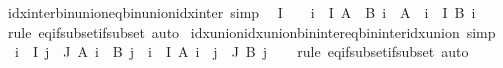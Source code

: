 \begin{isabellebody}
\endisatagproof
{\isafoldproof}%
%
\isadelimproof
\isanewline
%
\endisadelimproof
\isanewline
{}\isamarkupfalse%
\ idx{\isacharunderscore}{\kern0pt}inter{\isacharunderscore}{\kern0pt}bin{\isacharunderscore}{\kern0pt}union{\isacharunderscore}{\kern0pt}eq{\isacharunderscore}{\kern0pt}bin{\isacharunderscore}{\kern0pt}union{\isacharunderscore}{\kern0pt}idx{\isacharunderscore}{\kern0pt}inter\ {\isacharbrackleft}{\kern0pt}simp{\isacharbrackright}{\kern0pt}{\isacharcolon}{\kern0pt}\isanewline
\ \ {\isachardoublequoteopen}I\ {\isasymnoteq}\ {\isacharbraceleft}{\kern0pt}{\isacharbraceright}{\kern0pt}\ {\isasymLongrightarrow}\ {\isacharparenleft}{\kern0pt}{\isasymInter}i\ {\isasymin}\ I{\isachardot}{\kern0pt}\ A\ {\isasymunion}\ B\ i{\isacharparenright}{\kern0pt}\ {\isacharequal}{\kern0pt}\ A\ {\isasymunion}\ {\isacharparenleft}{\kern0pt}{\isasymInter}i\ {\isasymin}\ I{\isachardot}{\kern0pt}\ B\ i{\isacharparenright}{\kern0pt}{\isachardoublequoteclose}\isanewline
%
\isadelimproof
\ \ %
\endisadelimproof
%
\isatagproof
{}\isamarkupfalse%
\ {\isacharparenleft}{\kern0pt}rule\ eq{\isacharunderscore}{\kern0pt}if{\isacharunderscore}{\kern0pt}subset{\isacharunderscore}{\kern0pt}if{\isacharunderscore}{\kern0pt}subset{\isacharparenright}{\kern0pt}\ auto%
\endisatagproof
{\isafoldproof}%
%
\isadelimproof
\isanewline
%
\endisadelimproof
\isanewline
{}\isamarkupfalse%
\ idx{\isacharunderscore}{\kern0pt}union{\isacharunderscore}{\kern0pt}idx{\isacharunderscore}{\kern0pt}union{\isacharunderscore}{\kern0pt}bin{\isacharunderscore}{\kern0pt}inter{\isacharunderscore}{\kern0pt}eq{\isacharunderscore}{\kern0pt}bin{\isacharunderscore}{\kern0pt}inter{\isacharunderscore}{\kern0pt}idx{\isacharunderscore}{\kern0pt}union\ {\isacharbrackleft}{\kern0pt}simp{\isacharbrackright}{\kern0pt}{\isacharcolon}{\kern0pt}\isanewline
\ \ {\isachardoublequoteopen}{\isacharparenleft}{\kern0pt}{\isasymUnion}i\ {\isasymin}\ I{\isachardot}{\kern0pt}\ {\isasymUnion}j\ {\isasymin}\ J{\isachardot}{\kern0pt}\ A\ i\ {\isasyminter}\ B\ j{\isacharparenright}{\kern0pt}\ {\isacharequal}{\kern0pt}\ {\isacharparenleft}{\kern0pt}{\isasymUnion}i\ {\isasymin}\ I{\isachardot}{\kern0pt}\ A\ i{\isacharparenright}{\kern0pt}\ {\isasyminter}\ {\isacharparenleft}{\kern0pt}{\isasymUnion}j\ {\isasymin}\ J{\isachardot}{\kern0pt}\ B\ j{\isacharparenright}{\kern0pt}{\isachardoublequoteclose}\isanewline
%
\isadelimproof
\ \ %
\endisadelimproof
%
\isatagproof
{}\isamarkupfalse%
\ {\isacharparenleft}{\kern0pt}rule\ eq{\isacharunderscore}{\kern0pt}if{\isacharunderscore}{\kern0pt}subset{\isacharunderscore}{\kern0pt}if{\isacharunderscore}{\kern0pt}subset{\isacharparenright}{\kern0pt}\ auto%

\end{isabellebody}
